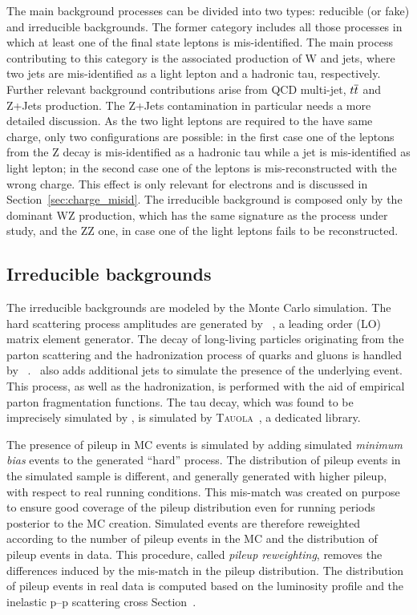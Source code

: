 The main background processes can be divided into two types: reducible (or fake) and irreducible backgrounds. The former category includes all those processes in which at least one of the final state leptons is mis-identified. The main process contributing to this category is the associated production of W and jets, where two jets are mis-identified as a light lepton and a hadronic tau, respectively. Further relevant background contributions arise from QCD multi-jet, $t\overline{t}$ and Z+Jets production. The Z+Jets contamination in particular needs a more detailed discussion. As the two light leptons are required to the have same charge, only two configurations are possible: in the first case one of the leptons from the Z decay is mis-identified as a hadronic tau while a jet is mis-identified as light lepton; in the second case one of the leptons is mis-reconstructed with the wrong charge. This effect is only relevant for electrons and is discussed in Section~\ref{sec:charge_misid}. The irreducible background is composed only by the dominant WZ production, which has the same signature as the process under study, and the ZZ one, in case one of the light leptons fails to be reconstructed.

\subsection{Irreducible backgrounds}

The irreducible backgrounds are modeled by the Monte Carlo simulation. The hard scattering process amplitudes are generated by \madgraph~\cite{MG4}, a leading order (LO) matrix element generator. The decay of long-living particles originating from the parton scattering and the hadronization process of quarks and gluons is handled by \pythia\ \cite{pythia}. \pythia\ also adds additional jets to simulate the presence of the underlying event. This process, as well as the hadronization, is performed with the aid of empirical parton fragmentation functions. The tau decay, which was found to be imprecisely simulated by \pythia, is simulated by \textsc{Tauola}~\cite{tauola}, a dedicated library. 

The presence of pileup in MC events is simulated by adding simulated \emph{minimum bias} events to the generated ``hard'' process. The distribution of pileup events in the simulated sample is different, and generally generated with higher pileup, with respect to real running conditions. 
This mis-match was created on purpose to ensure good coverage of the pileup distribution even for running periods posterior to the MC creation.
Simulated events are therefore reweighted according to the number of pileup events in the MC and the distribution of pileup events in data. This procedure, called \emph{pileup reweighting}, removes the differences induced by the mis-match in the pileup distribution. The distribution of pileup events in real data is computed based on the luminosity profile and the inelastic p--p scattering cross Section~\cite{Antchev:2013paa}.

